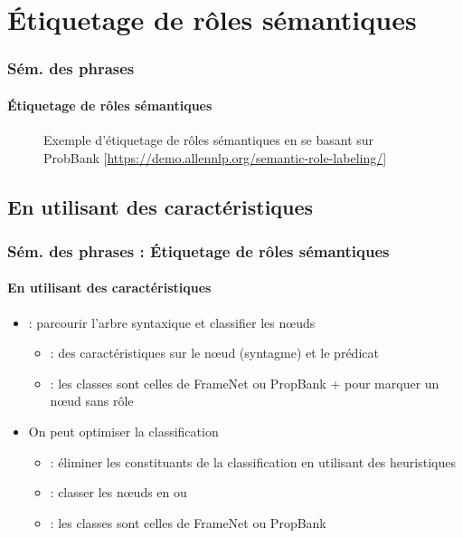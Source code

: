 \documentclass[xcolor=table]{beamer}
\begin{document}
\section{Étiquetage de rôles sémantiques}

\begin{frame}
\frametitle{Sém. des phrases}
\framesubtitle{Étiquetage de rôles sémantiques}

\begin{figure}
	\caption{Exemple d'étiquetage de rôles sémantiques en se basant sur ProbBank [\url{https://demo.allennlp.org/semantic-role-labeling/}]}
\end{figure}
	
\end{frame}

\subsection{En utilisant des caractéristiques}

\begin{frame}
	\frametitle{Sém. des phrases : Étiquetage de rôles sémantiques}
	\framesubtitle{En utilisant des caractéristiques}
	
	\begin{itemize}
		\item {} : parcourir l'arbre syntaxique et classifier les nœuds
		\begin{itemize}
			\item {} : des caractéristiques sur le nœud (syntagme) et le prédicat 
			\item {} : les classes sont celles de FrameNet ou PropBank +  pour marquer un nœud sans rôle 
		\end{itemize} 
		\item On peut optimiser la classification
		\begin{itemize}
			\item {} : éliminer les constituants de la classification en utilisant des heuristiques
			\item {} : classer les nœuds en  ou 
			\item {} : les classes sont celles de FrameNet ou PropBank
		\end{itemize} 
	\end{itemize}
	
\end{frame}
\end{document}
